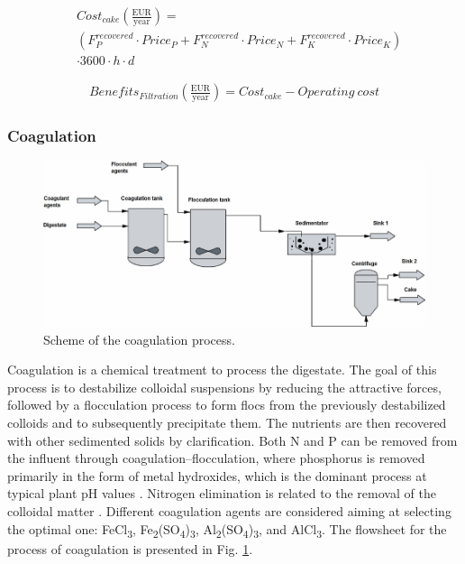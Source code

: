 \begin{refsection}[referencesCh2]
\begin{align}
	& Cost_{cake} \left( \frac{\text{EUR}}{\text{year}} \right) = \label{eq:Eq15} \\ 
	& \left( {F_P^{recovered}\cdot{Price_P} + F_N^{recovered}\cdot{Price}_N} + F_K^{recovered}\cdot{Price_K} \right) \nonumber \\
	& \cdot 3600\cdot h \cdot d \nonumber
\end{align}

\begin{align}
	{{Benefits}}_{Filtration} \left(\frac{\text{EUR}}{\text{year}}  \right) = Cost_{cake} - {{Operating \  cost}} \label{eq:Eq16}
\end{align}

\subsubsection{Coagulation}
\begin{figure}[h]
	\centering
	\includegraphics[width=1\linewidth, trim={0cm 0cm 0cm 0cm},clip]{gfx/Chapter2/Fig3.pdf} 
	\caption{Scheme of the coagulation process.}
	\label{fig:CoagScheme}
\end{figure}

Coagulation is a chemical treatment to process the digestate. The goal of this process is to destabilize colloidal suspensions by reducing the attractive forces, followed by a flocculation process to form flocs from the previously destabilized colloids and to subsequently precipitate them. The nutrients are then recovered with other sedimented solids by clarification. Both N and P can be removed from the influent through coagulation–flocculation, where phosphorus is removed primarily in the form of metal hydroxides, which is the dominant process at typical plant pH values \citep{szabo2008significance}. Nitrogen elimination is related to the removal of the colloidal matter \citep{aguilar2002nutrient}. Different coagulation agents are considered aiming at selecting the optimal one: FeCl\textsubscript{3}, Fe\textsubscript{2}(SO\textsubscript{4})\textsubscript{3}, Al\textsubscript{2}(SO\textsubscript{4})\textsubscript{3}, and AlCl\textsubscript{3}. The flowsheet for the process of coagulation is presented in Fig. \ref{fig:CoagScheme}.


\end{refsection}
